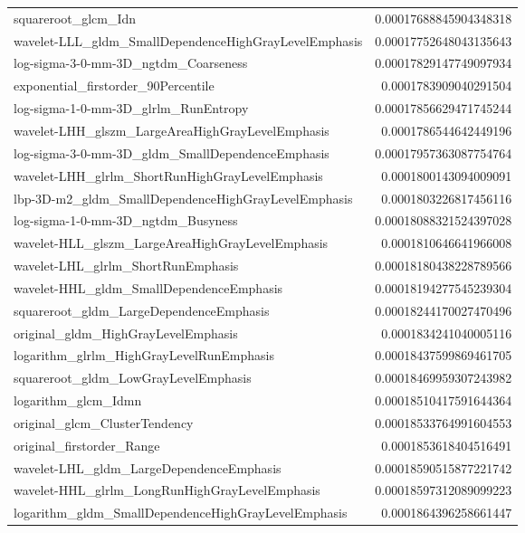 {\begin{xltabular}[H]{\textwidth}{X r}
        squareroot\_glcm\_Idn & 0.00017688845904348318 \\
        wavelet-LLL\_gldm\_SmallDependenceHighGrayLevelEmphasis & 0.00017752648043135643 \\
        log-sigma-3-0-mm-3D\_ngtdm\_Coarseness & 0.00017829147749097934 \\
        exponential\_firstorder\_90Percentile & 0.0001783909040291504 \\
        log-sigma-1-0-mm-3D\_glrlm\_RunEntropy & 0.00017856629471745244 \\
        wavelet-LHH\_glszm\_LargeAreaHighGrayLevelEmphasis & 0.0001786544642449196 \\
        log-sigma-3-0-mm-3D\_gldm\_SmallDependenceEmphasis & 0.00017957363087754764 \\
        wavelet-LHH\_glrlm\_ShortRunHighGrayLevelEmphasis & 0.0001800143094009091 \\
        lbp-3D-m2\_gldm\_SmallDependenceHighGrayLevelEmphasis & 0.0001803226817456116 \\
        log-sigma-1-0-mm-3D\_ngtdm\_Busyness & 0.00018088321524397028 \\
        wavelet-HLL\_glszm\_LargeAreaHighGrayLevelEmphasis & 0.0001810646641966008 \\
        wavelet-LHL\_glrlm\_ShortRunEmphasis & 0.00018180438228789566 \\
        wavelet-HHL\_gldm\_SmallDependenceEmphasis & 0.00018194277545239304 \\
        squareroot\_gldm\_LargeDependenceEmphasis & 0.00018244170027470496 \\
        original\_gldm\_HighGrayLevelEmphasis & 0.0001834241040005116 \\
        logarithm\_glrlm\_HighGrayLevelRunEmphasis & 0.00018437599869461705 \\
        squareroot\_gldm\_LowGrayLevelEmphasis & 0.00018469959307243982 \\
        logarithm\_glcm\_Idmn & 0.00018510417591644364 \\
        original\_glcm\_ClusterTendency & 0.00018533764991604553 \\
        original\_firstorder\_Range & 0.0001853618404516491 \\
        wavelet-LHL\_gldm\_LargeDependenceEmphasis & 0.00018590515877221742 \\
        wavelet-HHL\_glrlm\_LongRunHighGrayLevelEmphasis & 0.00018597312089099223 \\
        logarithm\_gldm\_SmallDependenceHighGrayLevelEmphasis & 0.0001864396258661447 \\

\end{xltabular}}
